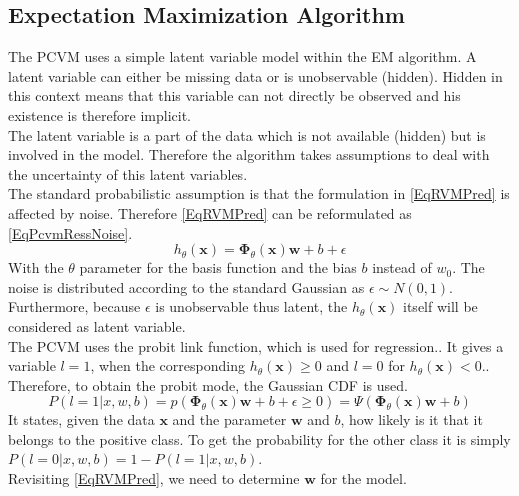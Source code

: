 \subsection{Expectation Maximization Algorithm}\label{PcSecEM}
The \acs{PCVM} uses a simple latent variable model within the \acs{EM} algorithm.\cite{Chen.2009}
A latent variable can either be missing data or is unobservable (hidden).\cite[p. 276-277]{TrevorHastie.2009}\cite[p. 84]{Bishop.2009}
Hidden in this context means that this variable can not directly be observed and his existence is therefore implicit.\cite{Borsboom.}\\
The latent variable is a part of the data which is not available (hidden) but is involved in the model.
Therefore the algorithm takes assumptions to deal with the uncertainty of this latent variables.\\
The standard probabilistic assumption is that the formulation in \eqref{EqRVMPred} is affected by noise.
Therefore \eqref{EqRVMPred} can be reformulated as \eqref{EqPcvmRessNoise}.\cite{Chen.2009}
\begin{equation}\label{EqPcvmRessNoise}
h_\theta (\mathbf{x}) = \boldsymbol{\Phi}_\theta(\mathbf{x}) \mathbf{w} + b +  \epsilon
\end{equation} 
With the $\theta$ parameter for the basis function and the bias $b$ instead of $w_0$.
The noise is distributed according to the standard Gaussian as $\epsilon \sim N(0,1)$.
Furthermore, because $\epsilon$ is unobservable thus latent, the $h_\theta(\mathbf{x})$ itself will be considered as latent variable.\cite{Chen.2009}\\
The \acs{PCVM} uses the probit link function, which is used for regression.\cite{Albert.1993}. It gives a variable $l = 1$, when the corresponding $h_\theta (\mathbf{x}) \ge 0$ and $l = 0$ for $h_\theta (\mathbf{x}) < 0$.\cite{Chen.2009}.
Therefore, to obtain the probit mode, the Gaussian \acs{CDF} is used.
\begin{equation}\label{EqProbitLinkProb}
P(l=1\vert x,w,b) = p(\boldsymbol{\Phi}_\theta(\mathbf{x})\mathbf{w} + b + \epsilon \ge 0) = \Psi(\boldsymbol{\Phi}_\theta(\mathbf{x})\mathbf{w} +b)
\end{equation}
It states, given the data $\mathbf{x}$ and the parameter $\mathbf{w}$ and $b$, how likely is it that it belongs to the positive class.
To get the probability for the other class it is simply $P(l=0 \vert x,w,b) = 1-P(l=1\vert x,w,b)$.\cite{Chen.2009}\\
Revisiting \eqref{EqRVMPred}, we need to determine $\mathbf{w}$ for the model.
